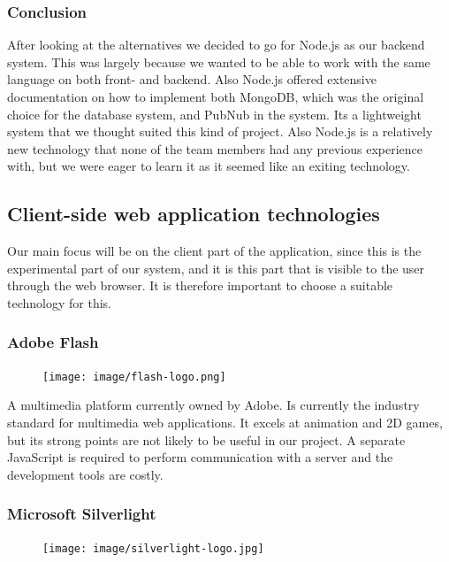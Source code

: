 \subsubsection{Conclusion}
After looking at the alternatives we decided to go for Node.js as our backend system. This was largely because we wanted to be able to work with the same language on both front- and backend. Also Node.js offered extensive documentation on how to implement both MongoDB, which was the original choice for the database system, and PubNub in the system. Its a lightweight system that we thought suited this kind of project. Also Node.js is a relatively new technology that none of the team members had any previous experience with, but we were eager to learn it as it seemed like an exiting technology.

\subsection{Client-side web application technologies}
Our main focus will be on the client part of the application, since this is the experimental part of our system, and it is this part that is visible to the user through the web browser. It is therefore important to choose a suitable technology for this.

\subsubsection{Adobe Flash}

\begin{figure}
\vspace{-30pt}
\centering
\texttt{[image: image/flash-logo.png]}
\end{figure}


A multimedia platform currently owned by Adobe. Is currently the industry standard for multimedia web applications. It excels at animation and 2D games, but its strong points are not likely to be useful in our project. A separate JavaScript is required to perform communication with a server and the development tools are costly.

\subsubsection{Microsoft Silverlight}

\begin{figure}
\vspace{-47pt}
\centering
\texttt{[image: image/silverlight-logo.jpg]}
\end{figure}

